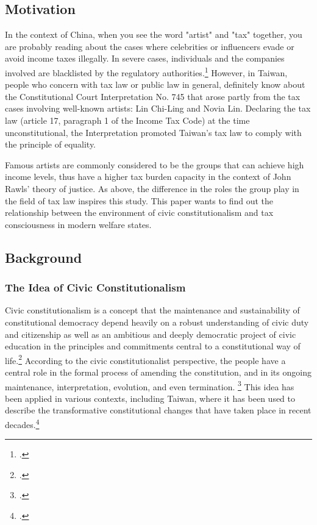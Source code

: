 \documentclass[]{article}
\begin{document}
\subsection{Motivation}
\label{sec:motivation}

In the context of China, when you see the word "artist" and "tax" together, you are probably reading about the cases where celebrities or influencers evade or avoid income taxes illegally. In severe cases, individuals and the companies involved are blacklisted by the regulatory authorities.\footcite{2021}
However, in Taiwan, people who concern with tax law or public law in general, definitely know about the Constitutional Court Interpretation No. 745 that arose partly from the tax cases involving well-known artists: Lin Chi-Ling and Novia Lin. Declaring the tax law (article 17, paragraph 1 of the Income Tax Code) at the time unconstitutional, the Interpretation promoted Taiwan's tax law to comply with the principle of equality.

Famous artists are commonly considered to be the groups that can achieve high income levels, thus have a higher tax burden capacity in the context of John Rawls' theory of justice. 
As above, the difference in the roles the group play in the field of tax law inspires this study. This paper wants to find out the relationship between the environment of civic constitutionalism and tax consciousness in modern welfare states.

\subsection{Background}


\subsubsection{The Idea of Civic Constitutionalism }


Civic constitutionalism is a concept that the maintenance and sustainability of constitutional democracy depend heavily on a robust understanding of civic duty and citizenship as well as an ambitious and deeply democratic project of civic education in the principles and commitments central to a constitutional way of life.\footcite[7]{finn2017other}
According to the civic constitutionalist perspective, the people have a central role in the formal process of amending the constitution, and in its ongoing maintenance, interpretation, evolution, and even termination. 
\footcite[at 382]{williams2004civic}
This idea has been applied in various contexts, including Taiwan, where it has been used to describe the transformative constitutional changes that have taken place in recent decades.\footcite{Yeh2015}
\end{document}
